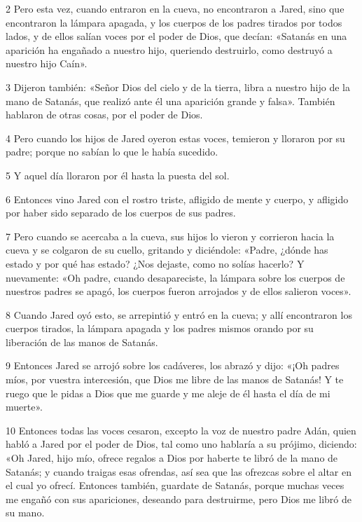 \par 2 Pero esta vez, cuando entraron en la cueva, no encontraron a Jared, sino que encontraron la lámpara apagada, y los cuerpos de los padres tirados por todos lados, y de ellos salían voces por el poder de Dios, que decían: «Satanás en una aparición ha engañado a nuestro hijo, queriendo destruirlo, como destruyó a nuestro hijo Caín».

\par 3 Dijeron también: «Señor Dios del cielo y de la tierra, libra a nuestro hijo de la mano de Satanás, que realizó ante él una aparición grande y falsa». También hablaron de otras cosas, por el poder de Dios.

\par 4 Pero cuando los hijos de Jared oyeron estas voces, temieron y lloraron por su padre; porque no sabían lo que le había sucedido.

\par 5 Y aquel día lloraron por él hasta la puesta del sol.

\par 6 Entonces vino Jared con el rostro triste, afligido de mente y cuerpo, y afligido por haber sido separado de los cuerpos de sus padres.

\par 7 Pero cuando se acercaba a la cueva, sus hijos lo vieron y corrieron hacia la cueva y se colgaron de su cuello, gritando y diciéndole: «Padre, ¿dónde has estado y por qué has estado? ¿Nos dejaste, como no solías hacerlo? Y nuevamente: «Oh padre, cuando desapareciste, la lámpara sobre los cuerpos de nuestros padres se apagó, los cuerpos fueron arrojados y de ellos salieron voces».

\par 8 Cuando Jared oyó esto, se arrepintió y entró en la cueva; y allí encontraron los cuerpos tirados, la lámpara apagada y los padres mismos orando por su liberación de las manos de Satanás.

\par 9 Entonces Jared se arrojó sobre los cadáveres, los abrazó y dijo: «¡Oh padres míos, por vuestra intercesión, que Dios me libre de las manos de Satanás! Y te ruego que le pidas a Dios que me guarde y me aleje de él hasta el día de mi muerte».

\par 10 Entonces todas las voces cesaron, excepto la voz de nuestro padre Adán, quien habló a Jared por el poder de Dios, tal como uno hablaría a su prójimo, diciendo: «Oh Jared, hijo mío, ofrece regalos a Dios por haberte te libró de la mano de Satanás; y cuando traigas esas ofrendas, así sea que las ofrezcas sobre el altar en el cual yo ofrecí. Entonces también, guardate de Satanás, porque muchas veces me engañó con sus apariciones, deseando para destruirme, pero Dios me libró de su mano.

